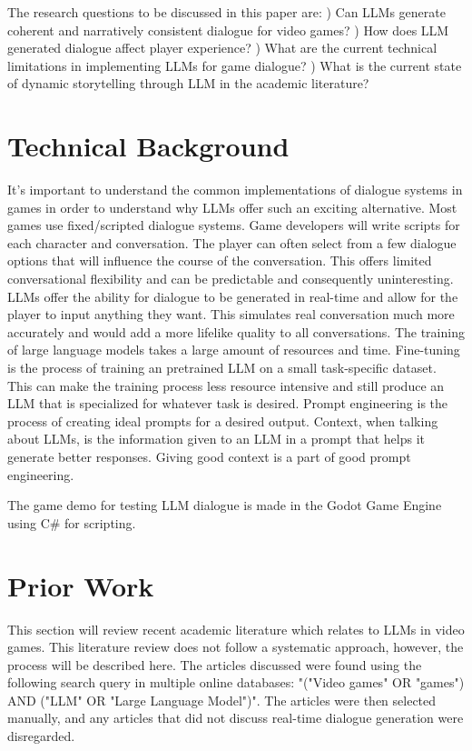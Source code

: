\documentclass[10pt,twocolumn]{article}
\begin{document}
    \par 
    The research questions to be discussed in this paper are:
        ) Can LLMs generate coherent and narratively consistent dialogue for video games? 
        ) How does LLM generated dialogue affect player experience?
        ) What are the current technical limitations in implementing LLMs for game dialogue?
        ) What is the current state of dynamic storytelling through LLM in the academic literature?
    
\section{Technical Background}
    
    \par
    It's important to understand the common implementations of dialogue systems in games in order to understand why LLMs offer such an exciting alternative. Most games use fixed/scripted dialogue systems. Game developers will write scripts for each character and conversation. The player can often select from a few dialogue options that will influence the course of the conversation. This offers limited conversational flexibility and can be predictable and consequently uninteresting. LLMs offer the ability for dialogue to be generated in real-time and allow for the player to input anything they want. This simulates real conversation much more accurately and would add a more lifelike quality to all conversations. The training of large language models takes a large amount of resources and time. Fine-tuning is the process of training an pretrained LLM on a small task-specific dataset. This can make the training process less resource intensive and still produce an LLM that is specialized for whatever task is desired. Prompt engineering is the process of creating ideal prompts for a desired output. Context, when talking about LLMs, is the information given to an LLM in a prompt that helps it generate better responses. Giving good context is a part of good prompt engineering. 
    
    \par 
    The game demo for testing LLM dialogue is made in the Godot Game Engine using C\# for scripting. 

\section{Prior Work}

    \par
    This section will review recent academic literature which relates to LLMs in video games. This literature review does not follow a systematic approach, however, the process will be described here. The articles discussed were found using the following search query in multiple online databases: "("Video games" OR "games") AND ("LLM" OR "Large Language Model")". The articles were then selected manually, and any articles that did not discuss real-time dialogue generation were disregarded. 
\end{document}
